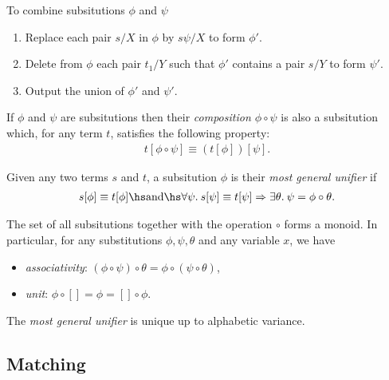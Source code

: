 \documentclass{article}
\begin{document}
\begin{definition}
	To combine subsitutions $\phi$ and $\psi$
	\begin{enumerate}
		\item Replace each pair $s/X$ in $\phi$ by $s\psi/X$ to form $\phi'$.
		\item Delete from $\phi$ each pair $t_1/Y$ such that $\phi'$ contains a pair $s/Y$ to form $\psi'$.
		\item Output the union of $\phi'$ and $\psi'$.
	\end{enumerate}
\end{definition}

\begin{definition}
	If $\phi$ and $\psi$ are subsitutions then their \emph{composition $\phi\circ\psi$}
	is also a subsitution which, for any term $t$, satisfies the following property:
	\begin{align*}
		t[\phi\circ\psi] \equiv (t[\phi])[\psi].
	\end{align*}
\end{definition}

\begin{definition}
	Given any two terms $s$ and $t$, a subsitution $\phi$ is their \emph{most general unifier}
	if
	\begin{align*}
		s[\phi]\equiv t[\phi] \hs\text{and}\hs
		\forall \psi.\: s[\psi] \equiv t[\psi]  \Rightarrow \exists \theta.\: \psi = \phi \circ \theta.
	\end{align*}
\end{definition}

\begin{theorem}
	The set of all subsitutions together with the operation $\circ$ forms a monoid. In particular,
	for any substitutions $\phi,\psi,\theta$ and any variable $x$, we have
	\begin{itemize}
		\item \emph{associativity}: $(\phi \circ \psi) \circ \theta = \phi \circ (\psi \circ \theta)$,
		\item \emph{unit}: $\phi\circ[] = \phi = []\circ\phi$.
	\end{itemize}
\end{theorem}

\begin{theorem}
	The \emph{most general unifier} is unique up to alphabetic variance.
\end{theorem}

\subsection{Matching}
\end{document}
